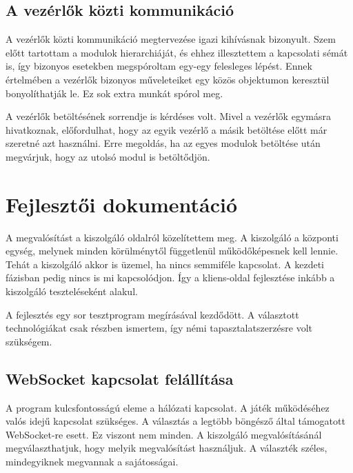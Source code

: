 \documentclass[]{article}
\begin{document}
\hypertarget{a-vezuxe9rlux151k-kuxf6zti-kommunikuxe1ciuxf3}{%
\subsection{A vezérlők közti
kommunikáció}\label{a-vezuxe9rlux151k-kuxf6zti-kommunikuxe1ciuxf3}}

A vezérlők közti kommunikáció megtervezése igazi kihívásnak bizonyult.
Szem előtt tartottam a modulok hierarchiáját, és ehhez illesztettem a
kapcsolati sémát is, így bizonyos esetekben megspóroltam egy-egy
felesleges lépést. Ennek értelmében a vezérlők bizonyos műveleteiket egy
közös objektumon keresztül bonyolíthatják le. Ez sok extra munkát spórol
meg.

A vezérlők betöltésének sorrendje is kérdéses volt. Mivel a vezérlők
egymásra hivatkoznak, előfordulhat, hogy az egyik vezérlő a másik
betöltése előtt már szeretné azt használni. Erre megoldás, ha az egyes
modulok betöltése után megvárjuk, hogy az utolsó modul is betöltődjön.

\hypertarget{fejlesztux151i-dokumentuxe1ciuxf3}{%
\section{Fejlesztői
dokumentáció}\label{fejlesztux151i-dokumentuxe1ciuxf3}}

A megvalósítást a kiszolgáló oldalról közelítettem meg. A kiszolgáló a
központi egység, melynek minden körülménytől függetlenül működőképesnek
kell lennie. Tehát a kiszolgáló akkor is üzemel, ha nincs semmiféle
kapcsolat. A kezdeti fázisban pedig nincs is mi kapcsolódjon. Így a
kliens-oldal fejlesztése inkább a kiszolgáló teszteléseként alakul.

A fejlesztés egy sor tesztprogram megírásával kezdődött. A választott
technológiákat csak részben ismertem, így némi tapasztalatszerzésre volt
szükségem.

\hypertarget{websocket-kapcsolat-feluxe1lluxedtuxe1sa}{%
\subsection{WebSocket kapcsolat
felállítása}\label{websocket-kapcsolat-feluxe1lluxedtuxe1sa}}

A program kulcsfontosságú eleme a hálózati kapcsolat. A játék
működéséhez valós idejű kapcsolat szükséges. A választás a legtöbb
böngésző által támogatott WebSocket-re esett. Ez viszont nem minden. A
kiszolgáló megvalósításánál megválaszthatjuk, hogy melyik megvalósítást
használjuk. A választék széles, mindegyiknek megvannak a sajátosságai.
\end{document}
